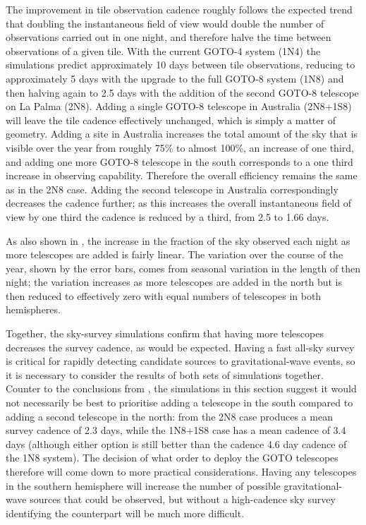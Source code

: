 \begin{colsection}
\begin{colsection}
The improvement in tile observation cadence roughly follows the expected trend that doubling the instantaneous field of view would double the number of observations carried out in one night, and therefore halve the time between observations of a given tile. With the current GOTO-4 system (1N4) the simulations predict approximately 10 days between tile observations, reducing to approximately 5 days with the upgrade to the full GOTO-8 system (1N8) and then halving again to 2.5 days with the addition of the second GOTO-8 telescope on La Palma (2N8). Adding a single GOTO-8 telescope in Australia (2N8+1S8) will leave the tile cadence effectively unchanged, which is simply a matter of geometry. Adding a site in Australia increases the total amount of the sky that is visible over the year from roughly 75\% to almost 100\%, an increase of one third, and adding one more GOTO-8 telescope in the south corresponds to a one third increase in observing capability. Therefore the overall efficiency remains the same as in the 2N8 case. Adding the second telescope in Australia correspondingly decreases the cadence further; as this increases the overall instantaneous field of view by one third the cadence is reduced by a third, from 2.5 to 1.66 days.

As also shown in , the increase in the fraction of the sky observed each night as more telescopes are added is fairly linear. The variation over the course of the year, shown by the error bars, comes from seasonal variation in the length of then night; the variation increases as more telescopes are added in the north but is then reduced to effectively zero with equal numbers of telescopes in both hemispheres.

Together, the sky-survey simulations confirm that having more telescopes decreases the survey cadence, as would be expected. Having a fast all-sky survey is critical for rapidly detecting candidate sources to gravitational-wave events, so it is necessary to consider the results of both sets of simulations together. Counter to the conclusions from , the simulations in this section suggest it would not necessarily be best to prioritise adding a telescope in the south compared to adding a second telescope in the north: from  the 2N8 case produces a mean survey cadence of 2.3 days, while the 1N8+1S8 case has a mean cadence of 3.4 days (although either option is still better than the cadence 4.6 day cadence of the 1N8 system). The decision of what order to deploy the GOTO telescopes therefore will come down to more practical considerations. Having any telescopes in the southern hemisphere will increase the number of possible gravitational-wave sources that could be observed, but without a high-cadence sky survey identifying the counterpart will be much more difficult.


\end{colsection}
\end{colsection}
